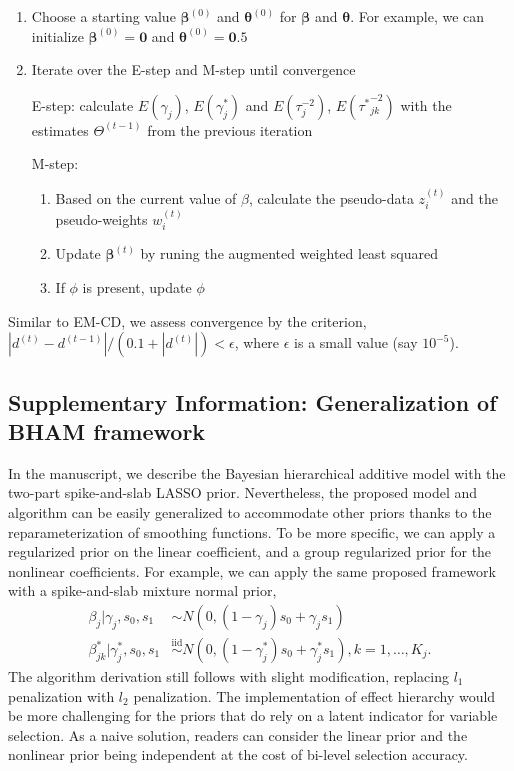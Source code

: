 \documentclass[
]{article}
\providecommand{\tightlist}{%
  \setlength{\itemsep}{0pt}\setlength{\parskip}{0pt}}
\begin{document}
\begin{enumerate}
\def\labelenumi{\arabic{enumi})}
\item
  Choose a starting value \(\boldsymbol{\beta}^{(0)}\) and
  \(\boldsymbol{\theta}^{(0)}\) for \(\boldsymbol{\beta}\) and
  \(\boldsymbol{\theta}\). For example, we can initialize
  \(\boldsymbol{\beta}^{(0)} = \boldsymbol{0}\) and
  \(\boldsymbol{\theta}^{(0)} = \boldsymbol{0}.5\)
\item
  Iterate over the E-step and M-step until convergence

  E-step: calculate \(E(\gamma_{j})\), \(E(\gamma^*_{j})\) and
  \(E(\tau^{-2}_{j})\), \(E({\tau^*}^{-2}_{jk})\) with the estimates
  \(\Theta^{(t-1)}\) from the previous iteration

  M-step:

  \begin{enumerate}
  \def\labelenumii{\alph{enumii})}
  \tightlist
  \item
    Based on the current value of \(\beta\), calculate the pseudo-data
    \(z_i^{(t)}\) and the pseudo-weights \(w_i^{(t)}\)
  \item
    Update \(\boldsymbol{\beta}^{(t)}\) by runing the augmented weighted
    least squared
  \item
    If \(\phi\) is present, update \(\phi\)
  \end{enumerate}
\end{enumerate}

Similar to EM-CD, we assess convergence by the criterion,
\(|d^{(t)}-d^{(t-1)}|/(0.1+|d^{(t)}|)<\epsilon\), where \(\epsilon\) is
a small value (say \(10^{-5}\)).

\subsection{Supplementary Information: Generalization of BHAM framework}

In the manuscript, we describe the Bayesian hierarchical additive model
with the two-part spike-and-slab LASSO prior. Nevertheless, the proposed
model and algorithm can be easily generalized to accommodate other
priors thanks to the reparameterization of smoothing functions. To be
more specific, we can apply a regularized prior on the linear
coefficient, and a group regularized prior for the nonlinear
coefficients. For example, we can apply the same proposed framework with
a spike-and-slab mixture normal prior, \begin{align*}
  \beta_{j} |\gamma_{j},s_0,s_1 &\sim N(0,(1-\gamma_{j}) s_0 + \gamma_{j} s_1)\\
  \beta^*_{jk} | \gamma^*_{j},s_0,s_1 &\overset{\text{iid}}{\sim}N(0,(1-\gamma^*_{j}) s_0 + \gamma^*_{j} s_1), k=1,\dots, K_j.
\end{align*} The algorithm derivation still follows with slight
modification, replacing \(l_1\) penalization with \(l_2\) penalization.
The implementation of effect hierarchy would be more challenging for the
priors that do rely on a latent indicator for variable selection. As a
naive solution, readers can consider the linear prior and the nonlinear
prior being independent at the cost of bi-level selection accuracy.
\end{document}
